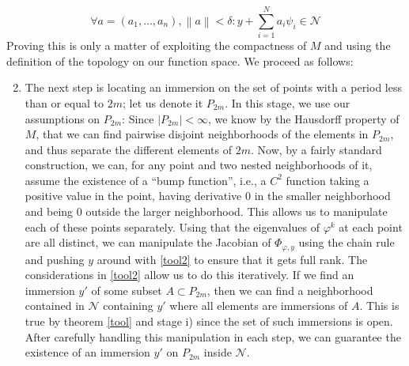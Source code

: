 \documentclass[11pt, a4paper]{memoir}
\theoremstyle{break}
\theoremstyle{break}
\theoremstyle{nonumberplain}
\newcommand{\norm}[1]{\left\lVert#1\right\rVert}
\begin{document}
\begin{equation}\label{tool2}
\forall a=(a_1,\ldots,a_n),\norm{a}< \delta: y+\sum_{i=1}^N a_i\psi_i\in \mathcal{N}
\end{equation}
Proving this is only a matter of exploiting the compactness of $M$ and using the definition of the topology on our function space. We proceed as follows:
\begin{enumerate}[label=\roman*)]
	\setcounter{enumi}{1}
	\item The next step is locating an immersion on the set of points with a period less than or equal to $2m$; let us denote it $P_{2m}$. In this stage, we use our assumptions on $P_{2m}$: Since $|P_{2m}|<\infty$, we know by the Hausdorff property of $M$, that we can find pairwise disjoint neighborhoods of the elements in $P_{2m}$, and thus separate the different elements of $2m$. Now, by a fairly standard construction, we can, for any point and two nested neighborhoods of it, assume the existence of a \enquote{bump function}, i.e., a $C^2$ function taking a positive value in the point, having derivative 0 in the smaller neighborhood and being 0 outside the larger neighborhood. This allows us to manipulate each of these points separately. Using that the eigenvalues of $\varphi^k$ at each point are all distinct, we can manipulate the Jacobian of $\Phi_{\varphi,y}$ using the chain rule and pushing $y$ around with \ref{tool2} to ensure that it gets full rank. The considerations in \ref{tool2} allow us to do this iteratively. If we find an immersion $y'$ of some subset $A\subset P_{2m}$, then we can find a neighborhood contained in $\mathcal{N}$ containing $y'$ where all elements are immersions of $A$. This is true by theorem \ref{tool} and stage i) since the set of such immersions is open. After carefully handling this manipulation in each step, we can guarantee the existence of an immersion $y'$ on $P_{2m}$ inside $\mathcal{N}$.

\end{enumerate}
\end{document}
